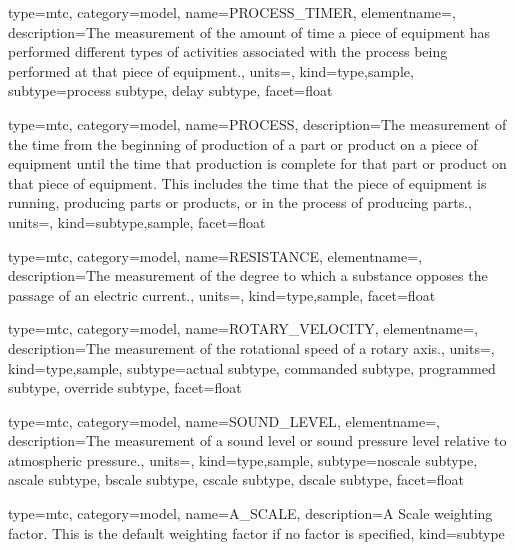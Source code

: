 {
  type=mtc,
  category=model,
  name={PROCESS\_TIMER},
  elementname=,
  description={The measurement of the amount of time a piece of equipment has performed different types of activities associated with the process being performed at that piece of equipment.},
  units=,
  kind={type,sample},
  subtype={\gls{process subtype}, \gls{delay subtype}},
  facet={\gls{float}}
}




{
  type=mtc,
  category=model,
  name={PROCESS},
  description={The measurement of the time from the beginning of production of a part or product on a piece of equipment until the time that production is complete for that part or product on that piece of equipment.  This includes the time that the piece of equipment is running, producing parts or products, or in the process of producing parts.},
  units=,
  kind={subtype,sample},
  facet={\gls{float}}
}


{
  type=mtc,
  category=model,
  name={RESISTANCE},
  elementname=,
  description={The measurement of the degree to which a substance opposes the passage of an electric current.},
  units=,
  kind={type,sample},
  facet={\gls{float}}
}


{
  type=mtc,
  category=model,
  name={ROTARY\_VELOCITY},
  elementname=,
  description={The measurement of the rotational speed of a rotary axis.},
  units=,
  kind={type,sample},
  subtype={\gls{actual subtype}, \gls{commanded subtype}, \gls{programmed subtype}, \gls{override subtype}},
  facet={\gls{float}}
}



{
  type=mtc,
  category=model,
  name={SOUND\_LEVEL},
  elementname=,
  description={The measurement of a sound level or sound pressure level relative to atmospheric pressure.},
  units=,
  kind={type,sample},
  subtype={\gls{noscale subtype}, \gls{ascale subtype}, \gls{bscale subtype}, \gls{cscale subtype}, \gls{dscale subtype}},
  facet={\gls{float}}
}


{
  type=mtc,
  category=model,
  name={A\_SCALE},
  description={A Scale weighting factor.   This is the default weighting factor if no factor is specified},
  kind={subtype}
}


